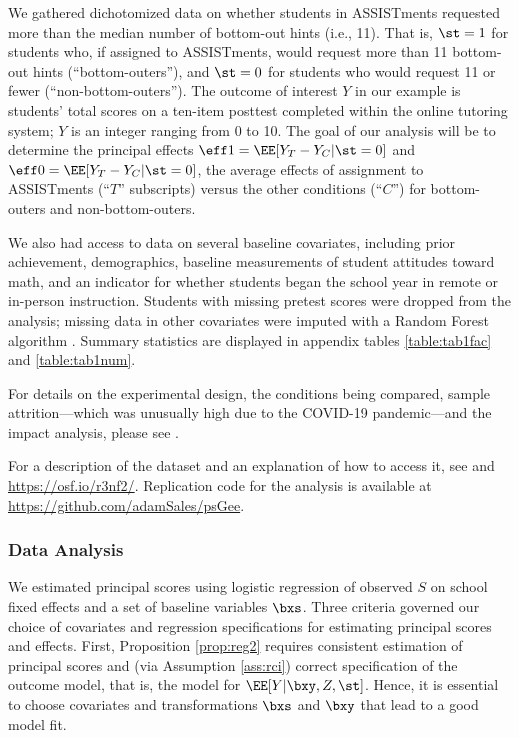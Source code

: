 \documentclass[]{article}
\begin{document}
\sloppy
We gathered dichotomized data on %
whether students in ASSISTments requested more than the median number of bottom-out hints (i.e., 11).
That is, $\st=1$ for students who, if assigned to ASSISTments, would request more than 11 bottom-out hints (``bottom-outers''), and $\st=0$ for students who would request 11 or fewer (``non-bottom-outers''). %
The outcome of interest $Y$ in our example is students' total scores on a ten-item posttest completed within the online tutoring system; $Y$ is an integer ranging from 0 to 10.
The goal of our analysis will be to determine the principal effects $\eff1=\EE[\yt-\yc|\st=0]$ and $\eff0=\EE[\yt-\yc|\st=0]$, the average effects of assignment to ASSISTments (``$T$'' subscripts) versus the other conditions (``$C$'') for bottom-outers and non-bottom-outers.

We also had access to data on several baseline covariates, including prior achievement, demographics, baseline measurements of student attitudes toward math, and an indicator for whether students began the school year in remote or in-person instruction.
Students with missing pretest scores were dropped from the analysis; missing data in other covariates were imputed with a Random Forest algorithm \citep{missForest}. Summary statistics are displayed in appendix tables \ref{table:tab1fac} and \ref{table:tab1num}.

For details on the experimental design, the conditions being compared, sample attrition---which was unusually high due to the COVID-19 pandemic---and the impact analysis, please see \citet{impactPaper}.

For a description of the dataset and an explanation of how to access it, see \citet{ottmar2023data} and \url{https://osf.io/r3nf2/}.
Replication code for the analysis is available at %
\url{https://github.com/adamSales/psGee}.

\subsubsection{Data Analysis}
We estimated principal scores using logistic regression of observed $S$ on school fixed effects and a set of baseline variables $\bxs$.
Three criteria governed our choice of covariates and regression specifications for estimating principal scores and effects.
First, Proposition \ref{prop:reg2} requires consistent estimation of principal scores and (via Assumption \ref{ass:rci}) correct specification of the outcome model, that is, the model for $\EE[Y|\bxy,Z,\st]$.
Hence, it is essential to choose covariates and transformations $\bxs$ and $\bxy$ that lead to a good model fit.
\end{document}
